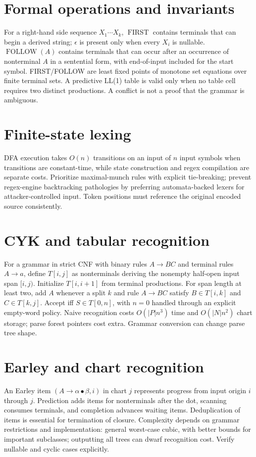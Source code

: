 \documentclass[11pt,letterpaper]{article}
\begin{document}
\section{Formal operations and invariants}
For a right-hand side sequence $X_1\cdots X_k$, $\operatorname{FIRST}$ contains terminals that can begin a derived string; $\epsilon$ is present only when every $X_i$ is nullable. $\operatorname{FOLLOW}(A)$ contains terminals that can occur after an occurrence of nonterminal $A$ in a sentential form, with end-of-input included for the start symbol. FIRST/FOLLOW are least fixed points of monotone set equations over finite terminal sets. A predictive LL(1) table is valid only when no table cell requires two distinct productions. A conflict is not a proof that the grammar is ambiguous.
\section{Finite-state lexing}
DFA execution takes $O(n)$ transitions on an input of $n$ input symbols when transitions are constant-time, while state construction and regex compilation are separate costs. Prioritize maximal-munch rules with explicit tie-breaking; prevent regex-engine backtracking pathologies by preferring automata-backed lexers for attacker-controlled input. Token positions must reference the original encoded source consistently.
\section{CYK and tabular recognition}
For a grammar in strict CNF with binary rules $A\to BC$ and terminal rules $A\to a$, define $T[i,j]$ as nonterminals deriving the nonempty half-open input span $[i,j)$. Initialize $T[i,i+1]$ from terminal productions. For span length at least two, add $A$ whenever a split $k$ and rule $A\to BC$ satisfy $B\in T[i,k]$ and $C\in T[k,j]$. Accept iff $S\in T[0,n]$, with $n=0$ handled through an explicit empty-word policy. Naive recognition costs $O(|P|n^3)$ time and $O(|N|n^2)$ chart storage; parse forest pointers cost extra. Grammar conversion can change parse tree shape.
\section{Earley and chart recognition}
An Earley item $(A\to\alpha\bullet\beta,i)$ in chart $j$ represents progress from input origin $i$ through $j$. Prediction adds items for nonterminals after the dot, scanning consumes terminals, and completion advances waiting items. Deduplication of items is essential for termination of closure. Complexity depends on grammar restrictions and implementation: general worst-case cubic, with better bounds for important subclasses; outputting all trees can dwarf recognition cost. Verify nullable and cyclic cases explicitly.
\end{document}
